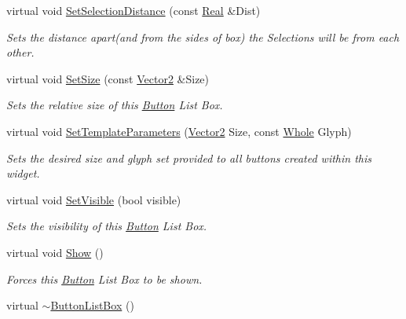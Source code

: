\begin{DoxyCompactItemize}
virtual void \hyperlink{classphys_1_1UI_1_1ButtonListBox_a843a4975bb7913bcc53d3a66c7f802fa}{SetSelectionDistance} (const \hyperlink{namespacephys_af7eb897198d265b8e868f45240230d5f}{Real} \&Dist)
\begin{DoxyCompactList}\small\item\em Sets the distance apart(and from the sides of box) the Selections will be from each other. \item\end{DoxyCompactList}\item 
virtual void \hyperlink{classphys_1_1UI_1_1ButtonListBox_affc95f7b3c3753b5a89eda7f84c78fb0}{SetSize} (const \hyperlink{classphys_1_1Vector2}{Vector2} \&Size)
\begin{DoxyCompactList}\small\item\em Sets the relative size of this \hyperlink{classphys_1_1UI_1_1Button}{Button} List Box. \item\end{DoxyCompactList}\item 
virtual void \hyperlink{classphys_1_1UI_1_1ButtonListBox_ac14c18e280d1e9fd39a850a9397633e0}{SetTemplateParameters} (\hyperlink{classphys_1_1Vector2}{Vector2} Size, const \hyperlink{namespacephys_a460f6bc24c8dd347b05e0366ae34f34a}{Whole} Glyph)
\begin{DoxyCompactList}\small\item\em Sets the desired size and glyph set provided to all buttons created within this widget. \item\end{DoxyCompactList}\item 
virtual void \hyperlink{classphys_1_1UI_1_1ButtonListBox_acee378e954050801fa8fffe835441bf4}{SetVisible} (bool visible)
\begin{DoxyCompactList}\small\item\em Sets the visibility of this \hyperlink{classphys_1_1UI_1_1Button}{Button} List Box. \item\end{DoxyCompactList}\item 
\hypertarget{classphys_1_1UI_1_1ButtonListBox_ad41d563b4fab1699fb14b56f776d5b1f}{
virtual void \hyperlink{classphys_1_1UI_1_1ButtonListBox_ad41d563b4fab1699fb14b56f776d5b1f}{Show} ()}
\label{classphys_1_1UI_1_1ButtonListBox_ad41d563b4fab1699fb14b56f776d5b1f}

\begin{DoxyCompactList}\small\item\em Forces this \hyperlink{classphys_1_1UI_1_1Button}{Button} List Box to be shown. \item\end{DoxyCompactList}\item 
\hypertarget{classphys_1_1UI_1_1ButtonListBox_afb7cf0d76f1f6825276694f0ebb7f4a6}{
virtual \hyperlink{classphys_1_1UI_1_1ButtonListBox_afb7cf0d76f1f6825276694f0ebb7f4a6}{$\sim$ButtonListBox} ()}
\label{classphys_1_1UI_1_1ButtonListBox_afb7cf0d76f1f6825276694f0ebb7f4a6}


\end{DoxyCompactItemize}
